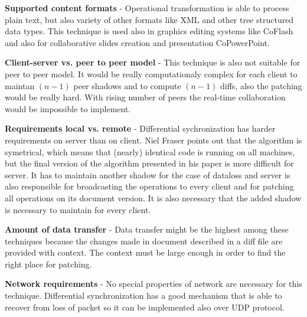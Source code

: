 \documentclass[12pt,oneside]{fithesis2}
\begin{document}
\vspace{3mm}
\newpage
\textbf{Supported content formats} - Operational transformation is able to process plain text, but also variety of other formats like XML and other tree structured data types. This technique is used also in graphics editing systems\cite{graphics} like CoFlash and also for collaborative slides creation and presentation CoPowerPoint.

\vspace{3mm}

\par \textbf{\underline{}}

\vspace{3mm}

\textbf{Client-server vs. peer to peer model} - This technique is also not suitable for peer to peer model. It would be really computationaly complex for each client to maintan \((n-1)\) peer shadows and to compute \((n-1)\) diffs, also the patching would be really hard. With rising number of peers the real-time collaboration would be impossible to implement.

\vspace{3mm}

\textbf{Requirements local vs. remote} - Differential sychronization has harder requirements on server than on client. Niel Fraser \cite{Fraser} points out that the algorithm is symetrical, which means that (nearly) identical code is running on all machines, but the final version of the algorithm presented in his paper is more difficult for server. It has to maintain another shadow for the case of dataloss and server is also responsible for broadcasting the operations to every client and for patching all operations on its document version. It is also necessary that the added shadow is necessary to maintain for every client.

\vspace{3mm}

\textbf{Amount of data transfer} - Data transfer might be the highest among these techniques because the changes made in document described in a diff file are provided with context. The context must be large enough in order to find the right place for patching.

\vspace{3mm}

\textbf{Network requirements} - No special properties of network are necessary for this technique. Differential synchronization has a good mechanism that is able to recover from loss of packet so it can be implemented also over UDP protocol.
\end{document}
